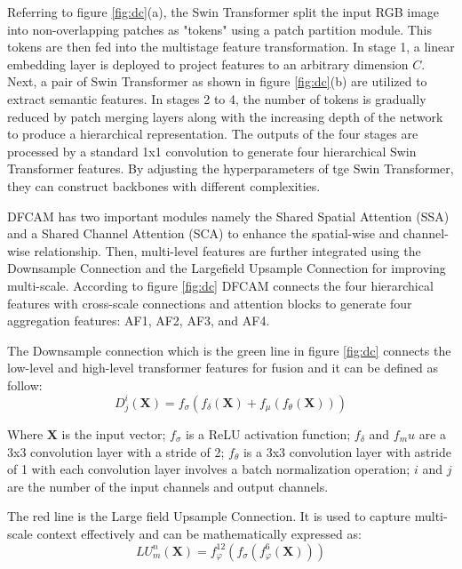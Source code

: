 Referring to figure \ref{fig:dc}(a), the Swin Transformer split the input RGB image into non-overlapping patches as "tokens" using a patch partition module. This tokens are then fed into the multistage feature transformation. In stage 1, a linear embedding layer is deployed to project features to an arbitrary dimension $C$. Next, a pair of Swin Transformer as shown in figure \ref{fig:dc}(b) are utilized to extract semantic features. In stages 2 to 4, the number of tokens is gradually reduced by patch merging layers along with the increasing depth of the network to produce a hierarchical representation. The outputs of the four stages are processed by a standard 1x1 convolution to generate four hierarchical Swin Transformer features. By adjusting the hyperparameters of tge Swin Transformer, they can construct backbones with different complexities.

DFCAM has two important modules namely the Shared Spatial Attention (SSA) and a Shared Channel Attention (SCA) to enhance the spatial-wise and channel-wise relationship. Then, multi-level features are further integrated using the Downsample Connection and the Largefield Upsample Connection for improving multi-scale. According to figure \ref{fig:dc} DFCAM connects the four hierarchical features with cross-scale connections and attention blocks to generate four aggregation features: AF1, AF2, AF3, and AF4.  

The Downsample connection which is the green line in figure \ref{fig:dc} connects the low-level and high-level transformer features for fusion and it can be defined as follow:
\begin{equation}
    D^i_j(\mathbf{X}) = f_\sigma(f_\delta(\mathbf{X}) + f_\mu(f_\theta(\mathbf{X})))
\end{equation}

Where $\mathbf{X}$ is the input vector; $f_\sigma$ is a ReLU activation function; $f_\delta$ and $f_mu$ are a 3x3 convolution layer with a stride of 2; $f_\theta$ is a 3x3 convolution layer with astride of 1 with each convolution layer involves a batch normalization operation; $i$ and $j$ are the number of the input channels and output channels.

The red line is the Large field Upsample Connection. It is used to capture multi-scale
context effectively and can be mathematically expressed as:
\begin{equation}
    LU^n_m(\mathbf{X}) = f^{12}_\varphi(f_\sigma(f^6_\varphi(\mathbf{X})))
\end{equation}

